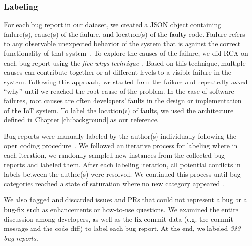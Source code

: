 \subsubsection{Labeling} 
 For each bug report in our dataset, we created a JSON object containing failure(s), cause(s) of the failure, and location(s) of the faulty code. Failure refers to any observable unexpected behavior of the system that is against the correct functionality of that system~\cite{bugCharOpenSoftware,failureDefinition}. To explore the causes of the failure, we did RCA on each bug report using the \emph{five whys technique}~\cite{serrat2017five}. Based on this technique, multiple causes can contribute together or at different levels to a visible failure in the system. Following this approach, we started from the failure and repeatedly asked ``why'' until we reached the root cause of the problem. In the case of software failures, root causes are often developers' faults in the design or implementation of the IoT system. To label the location(s) of faults, we used the architecture defined in Chapter \ref{ch:background} as our reference. 

Bug reports were manually labeled by the author(s) individually following the open coding procedure~\cite{qualitativeStudySE}. We followed an iterative process for labeling where in each iteration, we randomly sampled new instances from the collected bug reports and labeled them. After each labeling iteration, all potential conflicts in labels between the author(s) were resolved. We continued this process until bug categories reached a state of saturation where no new category appeared~\cite{dataSaturationFusch}. 

We also flagged and discarded issues and PRs that could not represent a bug or a bug-fix such as enhancements or how-to-use questions. We examined the entire discussion among developers, as well as the fix commit data (e.g. the commit message and the code diff) to label each bug report. At the end, we labeled \emph{323 bug reports}.

